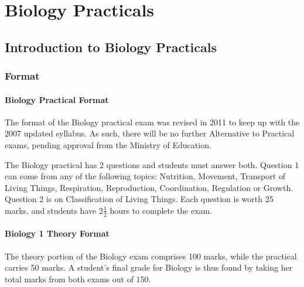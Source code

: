 \chapter{Biology Practicals}

\section{Introduction to Biology Practicals}

\subsection{Format}

%
%

\subsubsection{Biology Practical Format}

The format of the Biology practical exam was revised in 2011 to keep up with the 2007 updated syllabus. As such, there will be no further Alternative to Practical exams, pending approval from the Ministry of Education.

The Biology practical has 2 questions and students must answer both. Question 1 can come from any of the following topics: Nutrition, Movement, Transport of Living Things, Respiration, Reproduction, Coordination, Regulation or Growth. Question 2 is on Classification of Living Things. Each question is worth 25 marks, and students have 2$\frac{1}{2}$ hours to complete the exam.

\subsubsection{Biology 1 Theory Format}
The theory portion of the Biology exam comprises 100 marks, while the practical carries 50 marks. A student's final grade for Biology is thus found by taking her total marks from both exams out of 150.

